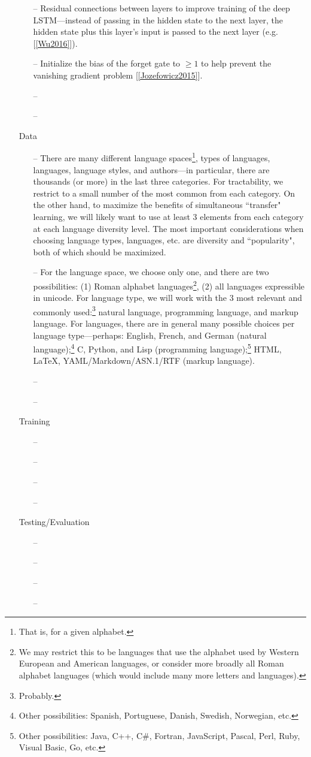 \documentclass[12pt,letterpaper]{article}
\theoremstyle{remark}
\theoremstyle{plain}
\begin{document}
\begin{enumerate}
\begin{enumerate}
\item[--] Residual connections between layers to improve training of the deep LSTM---instead of passing in the hidden state to the next layer, the hidden state plus this layer's input is passed to the next layer (e.g. [\ref{Wu2016}]). 
\item[--] Initialize the bias of the forget gate to $\geqslant 1$ to help prevent the vanishing gradient problem [\ref{Jozefowicz2015}].
\item[--] 
\item[--] 
\end{enumerate}
\item[] Data
\begin{enumerate}
\item[--] There are many different language spaces\footnote{That is, for a given alphabet.}, types of languages, languages, language styles, and authors---in particular, there are thousands (or more) in the last three categories. For tractability, we restrict to a small number of the most common from each category. On the other hand, to maximize the benefits of simultaneous ``transfer" learning, we will likely want to use at least 3 elements from each category at each language diversity level. The most important considerations when choosing language types, languages, etc. are diversity and ``popularity", both of which should be maximized. 
\item[--] For the language space, we choose only one, and there are two possibilities: (1) Roman alphabet languages\footnote{We may restrict this to be languages that use the alphabet used by Western European and American languages, or consider more broadly all Roman alphabet languages (which would include many more letters and languages).}, (2) all languages expressible in unicode. For language type, we will work with the 3 most relevant and commonly used:\footnote{Probably.} natural language, programming language, and markup language. For languages, there are in general many possible choices per language type---perhaps: English, French, and German (natural language);\footnote{Other possibilities: Spanish, Portuguese, Danish, Swedish, Norwegian, etc.} C, Python, and Lisp (programming language);\footnote{Other possibilities: Java, C++, C\#, Fortran, JavaScript, Pascal, Perl, Ruby, Visual Basic, Go, etc.} HTML, \LaTeX, YAML/Markdown/ASN.1/RTF (markup language).
\item[--] 
\item[--] 
\end{enumerate}
\item[] Training
\begin{enumerate}
\item[--] 
\item[--] 
\item[--] 
\item[--] 
\end{enumerate}
\item[] Testing/Evaluation
\begin{enumerate}
\item[--] 
\item[--] 
\item[--] 
\item[--] 
\end{enumerate}
\end{enumerate}
\end{document}
